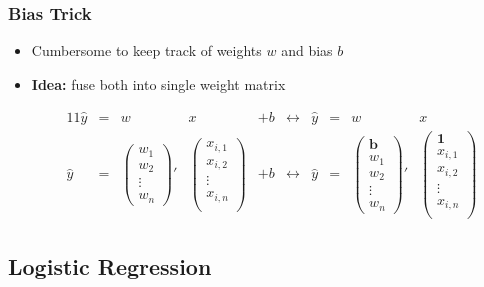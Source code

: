 \documentclass[aspectratio=1610]{beamer}
\begin{document}
\begin{frame}
\frametitle{Bias Trick}

\begin{itemize}
\item Cumbersome to keep track of weights $w$ and bias $b$
\item \textbf{Idea:} fuse both into single weight matrix

\begin{alignat*}{11}
\hat{y}&=&w&x&+b&\leftrightarrow&\hat{y}&=&w&x \\
\hat{y}&=&\begin{pmatrix}
w_{1} \\
w_{2} \\
\vdots \\
w_{n}
\end{pmatrix}'&
\begin{pmatrix}
x_{i,1}\\
x_{i,2}\\
\vdots\\
x_{i,n}\\
\end{pmatrix}&+b&\leftrightarrow&\hat{y}&=&
\begin{pmatrix}
\textbf{b} \\
w_{1} \\
w_{2} \\
\vdots \\
w_{n}
\end{pmatrix}'&
\begin{pmatrix}
\textbf{1}\\
x_{i,1}\\
x_{i,2}\\
\vdots\\
x_{i,n}\\
\end{pmatrix}
\end{alignat*}
\end{itemize}
\end{frame}

\subsection{Logistic Regression}
\label{subsec:logistic-regression}
\end{document}
